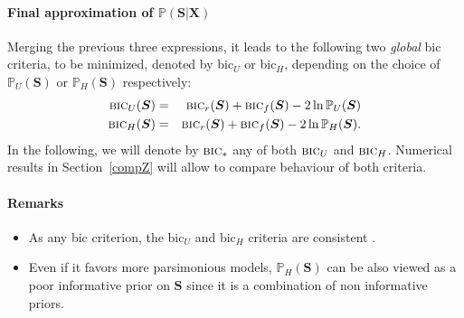 \documentclass[12pt,a4paper]{report}
\begin{document}
\paragraph{Final approximation of $\mathbb{P}(\boldsymbol{S}|\boldsymbol{X})$}
Merging the previous three expressions, it leads to the following two {\it global} {\sc bic} criteria, to be minimized, denoted by {\sc bic}$_U$ or {\sc bic}$_H$, depending on the choice of $\mathbb{P}_U(\boldsymbol{S})$ or $\mathbb{P}_H(\boldsymbol{S})$ respectively:
\begin{eqnarray}
\mbox{{\sc bic}}_U(\boldsymbol{S}) & = & \mbox{{\sc bic}}_r(\boldsymbol{S}) + \mbox{{\sc bic}}_f(\boldsymbol{S}) - 2\ln \mathbb{P}_U(\boldsymbol{S}) \\
\mbox{{\sc bic}}_H(\boldsymbol{S}) & = & \mbox{{\sc bic}}_r(\boldsymbol{S}) + \mbox{{\sc bic}}_f(\boldsymbol{S}) - 2\ln \mathbb{P}_H(\boldsymbol{S}).
\end{eqnarray}
In the following, we will denote by $\mbox{{\sc bic}}_*$ any of both $\mbox{{\sc bic}}_U$ and $\mbox{{\sc bic}}_H$. Numerical results in Section~\ref{compZ} will allow to compare behaviour of both criteria.

\paragraph{Remarks}
\begin{itemize}
\item As any {\sc bic} criterion, the {\sc bic}$_U$ and {\sc bic}$_H$ criteria are consistent \cite{BIChuard}.
\item Even if it favors more parsimonious models, $\mathbb{P}_H(\boldsymbol{S})$ can be also viewed as a poor informative prior on $\boldsymbol{S}$ since it is a combination of non informative priors.
\end{itemize}



%	 
%	
\end{document}

